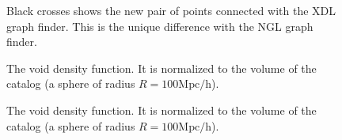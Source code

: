 \documentclass[preprint]{aastex62}
\begin{document}
\begin{figure}
  \caption{Black crosses shows the new pair of points connected with the
    XDL graph finder. This is the unique difference with the NGL graph
    finder.\label{fig:extra_connection}}
\end{figure}


\begin{figure}
  \caption{The void density function. It is normalized to the volume
    of the catalog (a sphere of radius $R=100\mathrm{Mpc/h}$).
    \label{fig:void_density_function}}
\end{figure}

\begin{figure}
  \caption{The void density function. It is normalized to the volume
    of the catalog (a sphere of radius $R=100\mathrm{Mpc/h}$).
    \label{fig:void_density_function}}
\end{figure}
\end{document}
